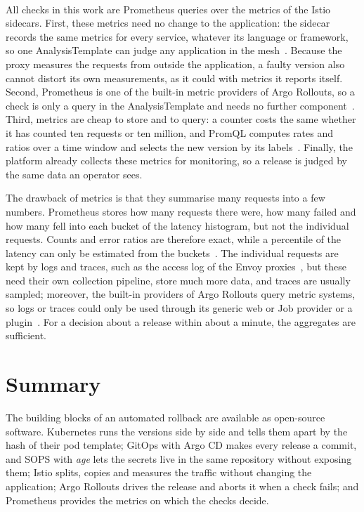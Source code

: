 \paragraph{} All checks in this work are Prometheus queries over the metrics of the Istio sidecars. First, these metrics need no change to the application: the sidecar records the same metrics for every service, whatever its language or framework, so one AnalysisTemplate can judge any application in the mesh~\cite{IstioMetrics}. Because the proxy measures the requests from outside the application, a faulty version also cannot distort its own measurements, as it could with metrics it reports itself. Second, Prometheus is one of the built-in metric providers of Argo Rollouts, so a check is only a query in the AnalysisTemplate and needs no further component~\cite{ArgoRolloutsAnalysis}. Third, metrics are cheap to store and to query: a counter costs the same whether it has counted ten requests or ten million, and PromQL computes rates and ratios over a time window and selects the new version by its labels~\cite{PromQL}. Finally, the platform already collects these metrics for monitoring, so a release is judged by the same data an operator sees.

The drawback of metrics is that they summarise many requests into a few numbers. Prometheus stores how many requests there were, how many failed and how many fell into each bucket of the latency histogram, but not the individual requests. Counts and error ratios are therefore exact, while a percentile of the latency can only be estimated from the buckets~\cite{PromHistograms}. The individual requests are kept by logs and traces, such as the access log of the Envoy proxies~\cite{IstioAccessLogs}, but these need their own collection pipeline, store much more data, and traces are usually sampled; moreover, the built-in providers of Argo Rollouts query metric systems, so logs or traces could only be used through its generic web or Job provider or a plugin~\cite{ArgoRolloutsAnalysis}. For a decision about a release within about a minute, the aggregates are sufficient.

\section{Summary}
\label{sec:BgSummary}
The building blocks of an automated rollback are available as open-source software. Kubernetes runs the versions side by side and tells them apart by the hash of their pod template; GitOps with Argo CD makes every release a commit, and SOPS with \textit{age} lets the secrets live in the same repository without exposing them; Istio splits, copies and measures the traffic without changing the application; Argo Rollouts drives the release and aborts it when a check fails; and Prometheus provides the metrics on which the checks decide.
